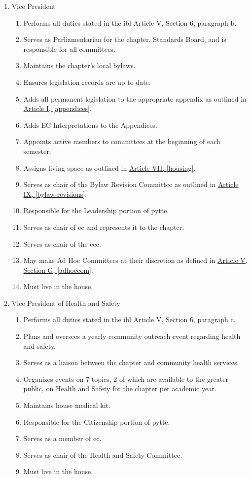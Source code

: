 \begin{enumerate}
		\item Vice President
			\begin{enumerate}
				\item Performs all duties stated in the \gls{ibl} Article V, Section 6, paragraph b.
				\item Serves as Parliamentarian for the chapter, Standards Board, and is responsible for all committees.
				\item Maintains the chapter's local bylaws. %
                		\item Ensures legislation records are up to date.
				\item Adds all permanent legislation to the appropriate appendix as outlined in \hyperref[appendices]{Article I, \autoref*{appendices}}.
				\item Adds EC Interpretations to the Appendices.
				\item Appoints active members to committees at the beginning of each semester.
				\item Assigns living space as outlined in \hyperref[housing]{Article VII, \autoref*{housing}}.
				\item Serves as chair of the Bylaw Revision Committee as outlined in \hyperref[bylaw-revisions]{Article IX, \autoref*{bylaw-revisions}}.
				\item Responsible for the Leadership portion of \gls{pytte}.
				\item Serves as chair of \gls{ec} and represents it to the chapter.
				\item Serves as chair of the \gls{ccc}.
				\item May make Ad Hoc Committees at their discretion as defined in \hyperref[adhoccom]{Article V, Section G, \autoref*{adhoccom}}.
				\item Must live in the house.
			\end{enumerate}

		\item Vice President of Health and Safety
			\begin{enumerate}
				\item Performs all duties stated in the \gls{ibl} Article V, Section 6, paragraph c.
				\item Plans and oversees a yearly community outreach event regarding health and safety.
				\item Serves as a liaison between the chapter and community health services.
				\item Organizes events on 7 topics, 2 of which are available to the greater public, on Health and Safety for the chapter per academic year.
				\item Maintains house medical kit.
				\item Responsible for the Citizenship portion of \gls{pytte}.
				\item Serves as a member of \gls{ec}.
				\item Serves as chair of the Health and Safety Committee.
				\item Must live in the house.
			\end{enumerate}


\end{enumerate}
